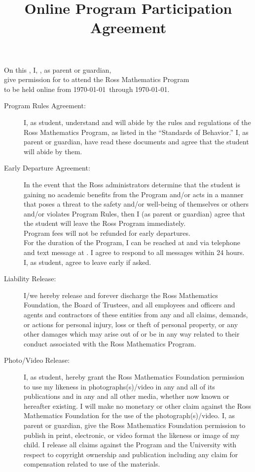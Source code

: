 \documentclass{ross}
\title{Online Program Participation Agreement}
\begin{document}
\maketitle


On this , I, , as parent or guardian, \\[5pt]
give permission for  to attend the Ross Mathematics Program \\[5pt]
to be held online from \startsunday\today\
through \finishfriday\today.

\begin{description}
\item[Program Rules Agreement:] I, as student, understand and will
  abide by the rules and regulations of the Ross Mathematics Program,
  as listed in the ``Standards of Behavior.'' I, as parent or
  guardian, have read these documents and agree that the student will
  abide by them.
  
\item[Early Departure Agreement:] In the event that the Ross
  administrators determine that the student is gaining no academic
  benefits from the Program and/or acts in a manner that poses a
  threat to the safety and/or well-being of themselves or others and/or
  violates Program Rules, then I (as parent or guardian) agree that
  the student will leave the Ross Program immediately. \\
Program fees will not be refunded for early departures.\\
   For the
  duration of the Program, I can be reached at
   and via telephone and text message at
  \blank{1.5in}{phone}{phone}. 
   I agree to respond to all messages within 24 hours. \\

  I, as student, agree to leave early if asked.  

\item[Liability Release:] I/we hereby release and forever discharge
  the Ross Mathematics Foundation, the Board of Trustees, and all
  employees and officers and agents and contractors of these entities
  from any and all claims, demands, or actions for personal injury,
  loss or theft of personal property, or any other damages which may
  arise out of or be in any way related to their conduct associated
  with the Ross Mathematics Program.
\item[Photo/Video Release:] I, as student, hereby grant the Ross
  Mathematics Foundation permission to use my likeness in
  photographs(s)/video in any and all of its publications and in any
  and all other media, whether now known or hereafter existing. I will
  make no monetary or other claim against the Ross Mathematics Foundation for the use of the photograph(s)/video. I, as parent or
  guardian, give the Ross Mathematics Foundation permission to publish in
  print, electronic, or video format the likeness or image of my
  child. I release all claims against the Program and the University
  with respect to copyright ownership and publication including any
  claim for compensation related to use of the materials.
\end{description}
\end{document}
